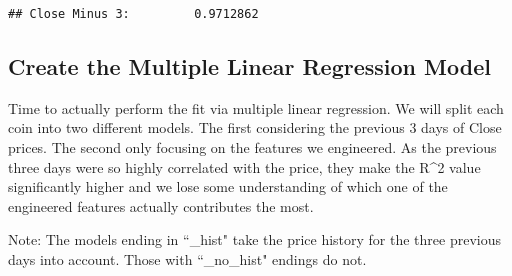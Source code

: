\documentclass[]{article}
\begin{document}
\begin{verbatim}
## Close Minus 3:         0.9712862
\end{verbatim}

\subsection{Create the Multiple Linear Regression
Model}\label{create-the-multiple-linear-regression-model}

Time to actually perform the fit via multiple linear regression. We will
split each coin into two different models. The first considering the
previous 3 days of Close prices. The second only focusing on the
features we engineered. As the previous three days were so highly
correlated with the price, they make the R\^{}2 value significantly
higher and we lose some understanding of which one of the engineered
features actually contributes the most.

Note: The models ending in ``\_hist" take the price history for the
three previous days into account. Those with ``\_no\_hist" endings do
not.
\end{document}
